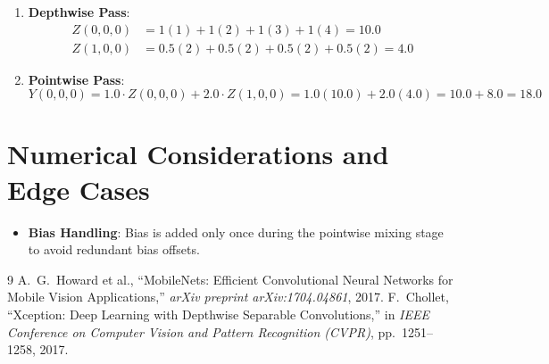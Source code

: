 \documentclass[11pt,a4paper]{article}
\theoremstyle{definition}
\begin{document}
\begin{enumerate}
    \item \textbf{Depthwise Pass}:
    \begin{align}
    Z(0, 0, 0) &= 1(1) + 1(2) + 1(3) + 1(4) = 10.0 \\
    Z(1, 0, 0) &= 0.5(2) + 0.5(2) + 0.5(2) + 0.5(2) = 4.0
    \end{align}
    \item \textbf{Pointwise Pass}:
    \begin{equation}
    Y(0, 0, 0) = 1.0 \cdot Z(0, 0, 0) + 2.0 \cdot Z(1, 0, 0) = 1.0(10.0) + 2.0(4.0) = 10.0 + 8.0 = 18.0
    \end{equation}
\end{enumerate}

\section{Numerical Considerations and Edge Cases}

\begin{itemize}
    \item \textbf{Bias Handling}: Bias is added only once during the pointwise mixing stage to avoid redundant bias offsets.
\end{itemize}

\begin{thebibliography}{9}
 A.~G.~Howard et al., ``MobileNets: Efficient Convolutional Neural Networks for Mobile Vision Applications,'' \emph{arXiv preprint arXiv:1704.04861}, 2017.
 F.~Chollet, ``Xception: Deep Learning with Depthwise Separable Convolutions,'' in \emph{IEEE Conference on Computer Vision and Pattern Recognition (CVPR)}, pp.~1251--1258, 2017.
\end{thebibliography}
\end{document}
